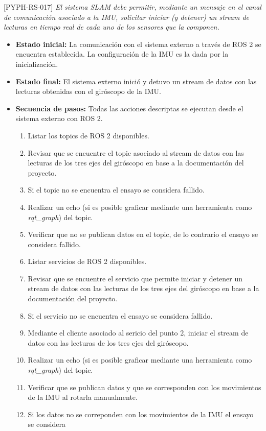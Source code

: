 \documentclass[
11pt, %
codirector, %
]{simple_charter}
\begin{document}
[PYPH-RS-017] \textit{El sistema SLAM debe permitir, mediante un mensaje en el canal de comunicación
asociado a la IMU, solicitar iniciar (y detener) un stream de lecturas en tiempo real de cada uno de
los sensores que la componen.}

\begin{itemize}
	\item \textbf{Estado inicial:} La comunicación con el sistema externo a través de ROS 2 se
	encuentra establecida. La configuración de la IMU es la dada por la inicialización.
	\item \textbf{Estado final:} El sistema externo inició y detuvo un stream de datos con las
	lecturas obtenidas con el giróscopo de la IMU.
	\item \textbf{Secuencia de pasos:} Todas las acciones descriptas se ejecutan desde el sistema
	externo con ROS 2.
	\begin{enumerate}
		\item Listar los topics de ROS 2 disponibles.
		\item Revisar que se encuentre el topic asociado al stream de datos con las lecturas de los
		tres ejes del giróscopo en base a la documentación del proyecto.
		\item Si el topic no se encuentra el ensayo se considera fallido.
		\item Realizar un echo (si es posible graficar mediante una herramienta como
		\textit{rqt\_graph}) del topic.
		\item Verificar que no se publican datos en el topic, de lo contrario el ensayo se considera
		fallido.
		\item Listar servicios de ROS 2 disponibles.
		\item Revisar que se encuentre el servicio que permite iniciar y detener un stream de datos
		con las lecturas de los tres ejes del giróscopo en base a la documentación del proyecto.
		\item Si el servicio no se encuentra el ensayo se considera fallido.
		\item Mediante el cliente asociado al sericio del punto 2, iniciar el stream de datos con
		las lecturas de los tres ejes del giróscopo.
		\item Realizar un echo (si es posible graficar mediante una herramienta como
		\textit{rqt\_graph}) del topic.
		\item Verificar que se publican datos y que se corresponden con los movimientos de la IMU
		al rotarla manualmente.
		\item Si los datos no se correponden con los movimientos de la IMU el ensayo se considera

\end{enumerate}
\end{itemize}
\end{document}
